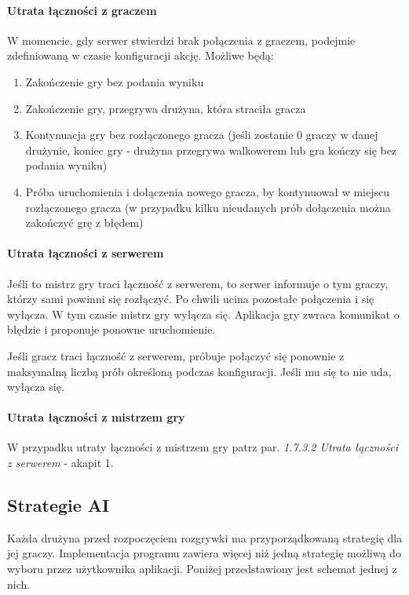 \documentclass[11pt]{article}
\let\Oldsubsection\subsection
\renewcommand{\subsection}{\FloatBarrier\Oldsubsection}
\begin{document}
\paragraph{Utrata łączności z graczem}
\par
W momencie, gdy serwer stwierdzi brak połączenia z graczem, podejmie zdefiniowaną w czasie konfiguracji akcję. Możliwe będą:
\begin{enumerate}
\item Zakończenie gry bez podania wyniku
\item Zakończenie gry, przegrywa drużyna, która straciła gracza
\item Kontynuacja gry bez rozłączonego gracza (jeśli zostanie 0 graczy w danej drużynie, koniec gry - drużyna przegrywa walkowerem lub gra kończy się bez podania wyniku)
\item Próba uruchomienia i dołączenia nowego gracza, by kontynuował w miejscu rozłączonego gracza (w przypadku kilku nieudanych prób dołączenia można zakończyć grę z błędem)
\end{enumerate}

\paragraph{Utrata łączności z serwerem}
\par
Jeśli to mistrz gry traci łączność z serwerem, to serwer informuje o tym graczy, którzy sami powinni się rozłączyć. Po chwili ucina pozostałe połączenia i się wyłącza. W tym czasie mistrz gry wyłącza się. Aplikacja gry zwraca komunikat o błędzie i proponuje ponowne uruchomienie.
\par
Jeśli gracz traci łączność z serwerem, próbuje połączyć się ponownie z maksymalną liczbą prób określoną podczas konfiguracji. Jeśli mu się to nie uda, wyłącza się.

\paragraph{Utrata łączności z mistrzem gry}
\par
W przypadku utraty łączności z mistrzem gry patrz par. \textit{1.7.3.2 Utrata łączności z serwerem} - akapit 1.

\subsection{Strategie AI}
\par
Każda drużyna przed rozpoczęciem rozgrywki ma przyporządkowaną strategię dla jej graczy. Implementacja programu zawiera więcej niż jedną strategię możliwą do wyboru przez użytkownika aplikacji. Poniżej przedstawiony jest schemat jednej z nich.
\end{document}
